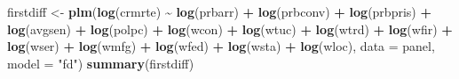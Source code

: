 \documentclass[
  12pt,
]{article}
\newenvironment{Shaded}{\begin{snugshade}}{\end{snugshade}}
\newcommand{\AttributeTok}[1]{\textcolor[rgb]{0.13,0.29,0.53}{#1}}
\newcommand{\FunctionTok}[1]{\textcolor[rgb]{0.13,0.29,0.53}{\textbf{#1}}}
\newcommand{\NormalTok}[1]{#1}
\newcommand{\OtherTok}[1]{\textcolor[rgb]{0.56,0.35,0.01}{#1}}
\newcommand{\SpecialCharTok}[1]{\textcolor[rgb]{0.81,0.36,0.00}{\textbf{#1}}}
\newcommand{\StringTok}[1]{\textcolor[rgb]{0.31,0.60,0.02}{#1}}
\begin{document}
\begin{Shaded}
\begin{Highlighting}[]
\NormalTok{firstdiff }\OtherTok{\textless{}{-}} \FunctionTok{plm}\NormalTok{(}\FunctionTok{log}\NormalTok{(crmrte) }\SpecialCharTok{\textasciitilde{}} \FunctionTok{log}\NormalTok{(prbarr) }\SpecialCharTok{+} \FunctionTok{log}\NormalTok{(prbconv) }\SpecialCharTok{+} \FunctionTok{log}\NormalTok{(prbpris)  }\SpecialCharTok{+} 
                   \FunctionTok{log}\NormalTok{(avgsen) }\SpecialCharTok{+} \FunctionTok{log}\NormalTok{(polpc) }\SpecialCharTok{+} \FunctionTok{log}\NormalTok{(wcon) }\SpecialCharTok{+} \FunctionTok{log}\NormalTok{(wtuc) }\SpecialCharTok{+} 
                   \FunctionTok{log}\NormalTok{(wtrd) }\SpecialCharTok{+} \FunctionTok{log}\NormalTok{(wfir) }\SpecialCharTok{+} \FunctionTok{log}\NormalTok{(wser) }\SpecialCharTok{+} \FunctionTok{log}\NormalTok{(wmfg) }\SpecialCharTok{+} 
                   \FunctionTok{log}\NormalTok{(wfed) }\SpecialCharTok{+} \FunctionTok{log}\NormalTok{(wsta) }\SpecialCharTok{+} \FunctionTok{log}\NormalTok{(wloc), }\AttributeTok{data =}\NormalTok{ panel, }\AttributeTok{model =} \StringTok{"fd"}\NormalTok{)}
\FunctionTok{summary}\NormalTok{(firstdiff)}
\end{Highlighting}
\end{Shaded}
\end{document}
